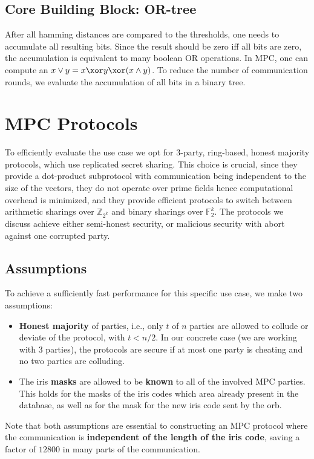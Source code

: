 \documentclass[a4paper,11pt,
]{article}
\newcommand{\F}{\ensuremath{\mathbb{F}}\xspace}
\newcommand{\Z}{\ensuremath{\mathbb{Z}}\xspace}
\begin{document}
\subsection{Core Building Block: OR-tree}

After all hamming distances are compared to the thresholds, one needs to accumulate all resulting bits. Since the result should be zero iff all bits are zero, the accumulation is equivalent to many boolean OR operations. In MPC, one can compute an $x \vee y = x \xor y \xor (x \wedge y)$. To reduce the number of communication rounds, we evaluate the accumulation of all bits in a binary tree.


\section{MPC Protocols}\label{sec::prelim:mpc}

To efficiently evaluate the use case we opt for 3-party, ring-based, honest majority protocols, which use replicated secret sharing. This choice is crucial, since they provide a dot-product subprotocol with communication being independent to the size of the vectors, they do not operate over prime fields hence computational overhead is minimized, and they provide efficient protocols to switch between arithmetic sharings over $\Z_{2^k}$ and binary sharings over $\F_2^k$. The protocols we discuss achieve either semi-honest security, or malicious security with abort against one corrupted party.

\subsection{Assumptions}

To achieve a sufficiently fast performance for this specific use case, we make two assumptions:
\begin{itemize}
    \item \textbf{Honest majority} of parties, i.e., only $t$ of $n$ parties are allowed to collude or deviate of the protocol, with $t < n/2$. In our concrete case (we are working with 3 parties), the protocols are secure if at most one party is cheating and no two parties are colluding.
    \item The iris \textbf{masks} are allowed to be \textbf{known} to all of the involved MPC parties. This holds for the masks of the iris codes which area already present in the database, as well as for the mask for the new iris code sent by the orb.
\end{itemize}
Note that both assumptions are essential to constructing an MPC protocol where the communication is \textbf{independent of the length of the iris code}, saving a factor of $12800$ in many parts of the communication.
\end{document}
